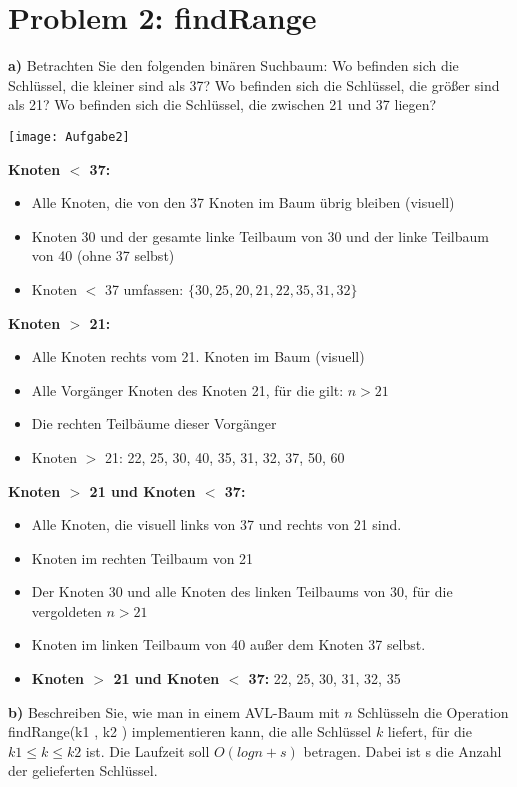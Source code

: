 \section*{Problem 2: findRange} 


\textbf{a)} Betrachten Sie den folgenden binären Suchbaum:
\noindent
Wo befinden sich die Schlüssel, die kleiner sind als 37? Wo befinden sich die
Schlüssel, die größer sind als 21? Wo befinden sich die Schlüssel, die zwischen
21 und 37 liegen?

\begin{center}
\texttt{[image: Aufgabe2]}
\end{center}


\textbf{Knoten $<$ 37:}
\begin{itemize}
\item Alle Knoten, die von den 37 Knoten im Baum übrig bleiben (visuell)
\item Knoten 30 und der gesamte linke Teilbaum von 30 und der linke Teilbaum von 40 (ohne 37 selbst)
\item Knoten $<$ 37 umfassen: $\{30, 25, 20, 21, 22, 35, 31, 32\}$
\end{itemize}


\textbf{Knoten $>$ 21:}
\begin{itemize}
\item Alle Knoten rechts vom 21. Knoten im Baum (visuell)
\item Alle Vorgänger Knoten des Knoten 21, für die gilt: $n > 21$
\item Die rechten Teilbäume dieser Vorgänger
\item Knoten $>$ 21: {22, 25, 30, 40, 35, 31, 32, 37, 50, 60}
\end{itemize}


\textbf{Knoten $>$ 21 und Knoten $<$ 37:}
\begin{itemize}
\item Alle Knoten, die visuell links von 37 und rechts von 21 sind.
\item Knoten im rechten Teilbaum von 21
\item Der Knoten 30 und alle Knoten des linken Teilbaums von 30, für die vergoldeten $n > 21$
\item Knoten im linken Teilbaum von 40 außer dem Knoten 37 selbst.
\item \textbf{Knoten $>$ 21 und Knoten $<$ 37:} {22, 25, 30, 31, 32, 35}
\end{itemize}


\newpage
\noindent
\textbf{b)} Beschreiben Sie, wie man in einem AVL-Baum mit $n$ Schlüsseln die Operation
findRange(k1 , k2 ) implementieren kann, die alle Schlüssel $k$ liefert, für die
$k1 \leq k \leq k2$ ist. Die Laufzeit soll $O(log n + s)$ betragen. Dabei ist s die Anzahl
der gelieferten Schlüssel.




 







